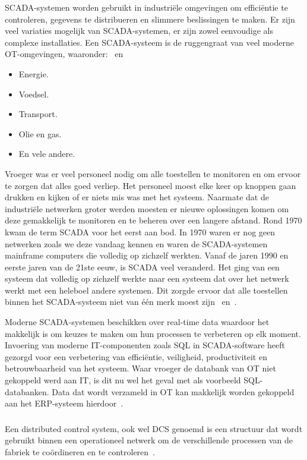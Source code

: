 SCADA-systemen worden gebruikt in industriële omgevingen om efficiëntie te controleren, gegevens te distribueren en slimmere beslissingen te maken. Er zijn veel variaties mogelijk van SCADA-systemen, er zijn zowel eenvoudige als complexe installaties. Een SCADA-systeem is de ruggengraat van veel moderne OT-omgevingen, waaronder:~\autocite{Muthukrishnan2021} en~\autocite{2018a}
\begin{itemize}
    \item Energie.
    \item Voedsel.
    \item Transport.
    \item Olie en gas.
    \item En vele andere.
\end{itemize}

Vroeger was er veel personeel nodig om alle toestellen te monitoren en om ervoor te zorgen dat alles goed verliep. Het personeel moest elke keer op knoppen gaan drukken en kijken of er niets mis was met het systeem. Naarmate dat de industriële netwerken groter werden moesten er nieuwe oplossingen komen om deze gemakkelijk te monitoren en te beheren over een langere afstand. Rond 1970 kwam de term SCADA voor het eerst aan bod. In 1970 waren er nog geen netwerken zoals we deze vandaag kennen en waren de SCADA-systemen mainframe computers die volledig op zichzelf werkten. Vanaf de jaren 1990 en eerste jaren van de 21ste eeuw, is SCADA veel veranderd. Het ging van een systeem dat volledig op zichzelf werkte naar een systeem dat over het netwerk werkt met een heleboel andere systemen. Dit zorgde ervoor dat alle toestellen binnen het SCADA-systeem niet van één merk moest zijn~\autocite{Muthukrishnan2021} en~\autocite{2018a}.

Moderne SCADA-systemen beschikken over real-time data waardoor het makkelijk is om keuzes te maken om hun processen te verbeteren op elk moment. Invoering van moderne IT-componenten zoals SQL in SCADA-software heeft gezorgd voor een verbetering van efficiëntie, veiligheid, productiviteit en betrouwbaarheid van het systeem. Waar vroeger de databank van OT niet gekoppeld werd aan IT, is dit nu wel het geval met als voorbeeld SQL-databanken. Data dat wordt verzameld in OT kan makkelijk worden gekoppeld aan het ERP-systeem hierdoor~\autocite{2018a}.

\subsubsection{}
\label{subsubsec:DCS}
Een distributed control system, ook wel DCS genoemd is een structuur dat wordt gebruikt binnen een operationeel netwerk om de verschillende processen van de fabriek te coördineren en te controleren~\autocite{Realpars2019}.

